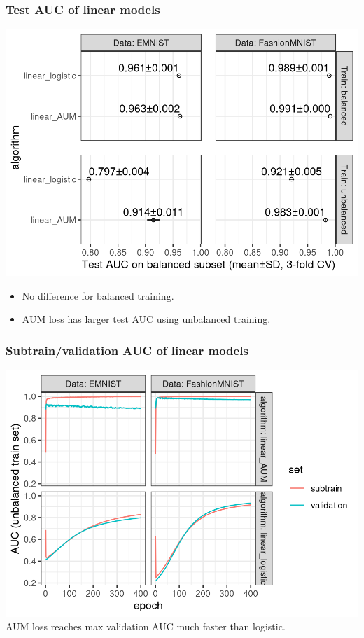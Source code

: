 \documentclass{beamer}
\begin{document}
\begin{frame}
  \frametitle{Test AUC of linear models}
  \includegraphics[width=\textwidth]{2025-04-04-nnet_prop0.01-test-auc}
  \vskip -0.2cm
  \begin{itemize}
  \item   No difference for balanced training.
  \item AUM loss has larger test AUC using unbalanced training.
  \end{itemize}
\end{frame}

\begin{frame}
  \frametitle{Subtrain/validation AUC of linear models}
  \includegraphics[width=\textwidth]{2025-04-04-nnet_prop0.01-train-auc}
  AUM loss reaches max validation AUC much faster than logistic.
\end{frame}
\end{document}
